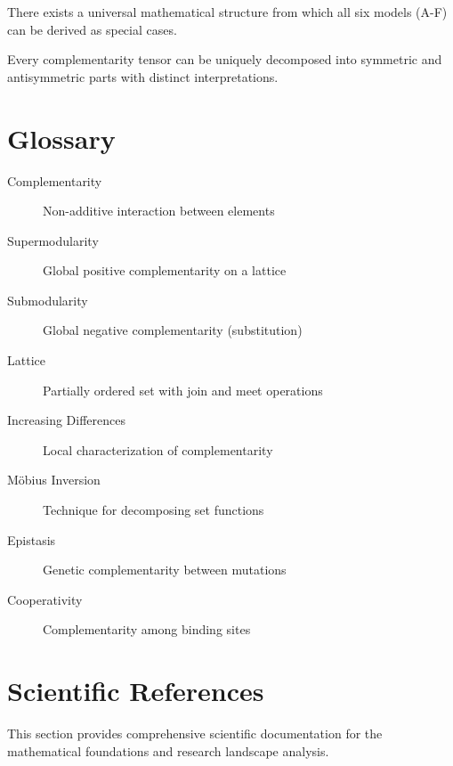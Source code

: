 \begin{conjecture}
There exists a universal mathematical structure from which all six models (A-F) can be derived as special cases.
\end{conjecture}

\begin{conjecture}
Every complementarity tensor can be uniquely decomposed into symmetric and antisymmetric parts with distinct interpretations.
\end{conjecture}

\section{Glossary}
\label{sec:glossary}

\begin{description}
    \item[Complementarity] Non-additive interaction between elements
    \item[Supermodularity] Global positive complementarity on a lattice
    \item[Submodularity] Global negative complementarity (substitution)
    \item[Lattice] Partially ordered set with join and meet operations
    \item[Increasing Differences] Local characterization of complementarity
    \item[Möbius Inversion] Technique for decomposing set functions
    \item[Epistasis] Genetic complementarity between mutations
    \item[Cooperativity] Complementarity among binding sites
\end{description}

\section{Scientific References}
\label{sec:references}

This section provides comprehensive scientific documentation for the mathematical foundations and research landscape analysis.

